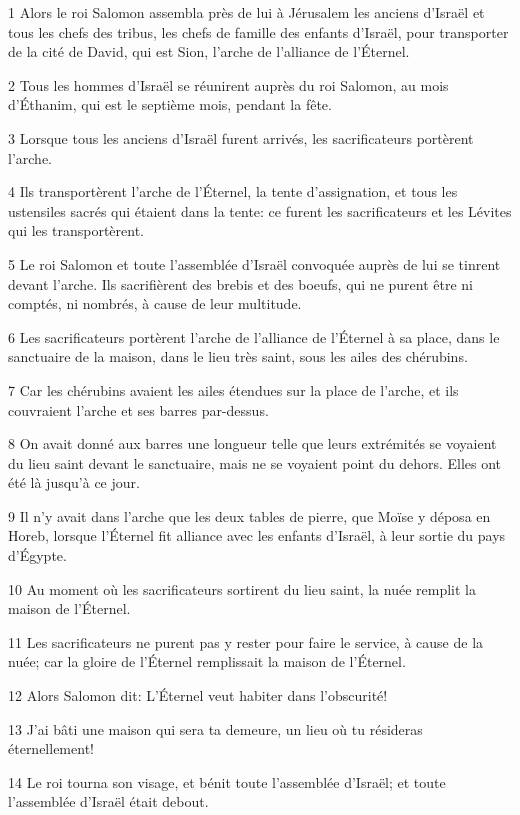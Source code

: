 \par 1 Alors le roi Salomon assembla près de lui à Jérusalem les anciens d'Israël et tous les chefs des tribus, les chefs de famille des enfants d'Israël, pour transporter de la cité de David, qui est Sion, l'arche de l'alliance de l'Éternel.
\par 2 Tous les hommes d'Israël se réunirent auprès du roi Salomon, au mois d'Éthanim, qui est le septième mois, pendant la fête.
\par 3 Lorsque tous les anciens d'Israël furent arrivés, les sacrificateurs portèrent l'arche.
\par 4 Ils transportèrent l'arche de l'Éternel, la tente d'assignation, et tous les ustensiles sacrés qui étaient dans la tente: ce furent les sacrificateurs et les Lévites qui les transportèrent.
\par 5 Le roi Salomon et toute l'assemblée d'Israël convoquée auprès de lui se tinrent devant l'arche. Ils sacrifièrent des brebis et des boeufs, qui ne purent être ni comptés, ni nombrés, à cause de leur multitude.
\par 6 Les sacrificateurs portèrent l'arche de l'alliance de l'Éternel à sa place, dans le sanctuaire de la maison, dans le lieu très saint, sous les ailes des chérubins.
\par 7 Car les chérubins avaient les ailes étendues sur la place de l'arche, et ils couvraient l'arche et ses barres par-dessus.
\par 8 On avait donné aux barres une longueur telle que leurs extrémités se voyaient du lieu saint devant le sanctuaire, mais ne se voyaient point du dehors. Elles ont été là jusqu'à ce jour.
\par 9 Il n'y avait dans l'arche que les deux tables de pierre, que Moïse y déposa en Horeb, lorsque l'Éternel fit alliance avec les enfants d'Israël, à leur sortie du pays d'Égypte.
\par 10 Au moment où les sacrificateurs sortirent du lieu saint, la nuée remplit la maison de l'Éternel.
\par 11 Les sacrificateurs ne purent pas y rester pour faire le service, à cause de la nuée; car la gloire de l'Éternel remplissait la maison de l'Éternel.
\par 12 Alors Salomon dit: L'Éternel veut habiter dans l'obscurité!
\par 13 J'ai bâti une maison qui sera ta demeure, un lieu où tu résideras éternellement!
\par 14 Le roi tourna son visage, et bénit toute l'assemblée d'Israël; et toute l'assemblée d'Israël était debout.
